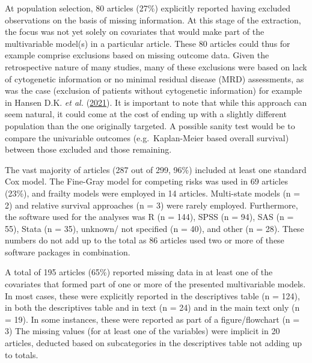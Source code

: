 \documentclass[
  letterpaper,
  DIV=11,
  numbers=noendperiod]{scrreprt}
\begin{document}
At population selection, 80 articles (27\%) explicitly reported having
excluded observations on the basis of missing information. At this stage
of the extraction, the focus was not yet solely on covariates that would
make part of the multivariable model(s) in a particular article. These
80 articles could thus for example comprise exclusions based on missing
outcome data. Given the retrospective nature of many studies, many of
these exclusions were based on lack of cytogenetic information or no
minimal residual disease (MRD) assessments, as was the case (exclusion
of patients without cytogenetic information) for example in Hansen D.K.
\emph{et al.}
(\protect\hyperlink{ref-hansend.k.ELN2017Genetic2021}{2021}). It is
important to note that while this approach can seem natural, it could
come at the cost of ending up with a slightly different population than
the one originally targeted. A possible sanity test would be to compare
the univariable outcomes (e.g.~Kaplan-Meier based overall survival)
between those excluded and those remaining.

The vast majority of articles (287 out of 299, 96\%) included at least
one standard Cox model. The Fine-Gray model for competing risks was used
in 69 articles (23\%), and frailty models were employed in 14 articles.
Multi-state models (n = 2) and relative survival approaches (n = 3) were
rarely employed. Furthermore, the software used for the analyses was R
(n = 144), SPSS (n = 94), SAS (n = 55), Stata (n = 35), unknown/ not
specified (n = 40), and other (n = 28). These numbers do not add up to
the total as 86 articles used two or more of these software packages in
combination.

A total of 195 articles (65\%) reported missing data in at least one of
the covariates that formed part of one or more of the presented
multivariable models. In most cases, these were explicitly reported in
the descriptives table (n = 124), in both the descriptives table and in
text (n = 24) and in the main text only (n = 19). In some instances,
these were reported as part of a figure/flowchart (n = 3) The missing
values (for at least one of the variables) were implicit in 20 articles,
deducted based on subcategories in the descriptives table not adding up
to totals.
\end{document}
